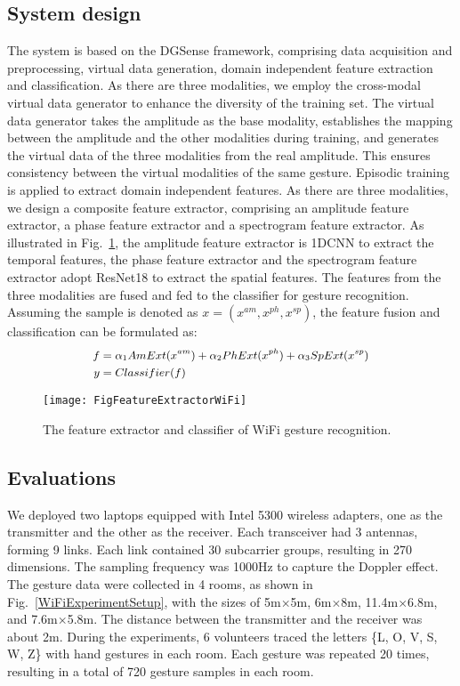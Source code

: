 \documentclass[journal]{IEEEtran}
\begin{document}
\subsection{System design} 
The system is based on the DGSense framework, comprising data acquisition and preprocessing, virtual data generation, domain independent feature extraction and classification. As there are three modalities, we employ the cross-modal virtual data generator to enhance the diversity of the training set. The virtual data generator takes the amplitude as the base modality, establishes the mapping between the amplitude and the other modalities during training, and generates the virtual data of the three modalities from the real amplitude. This ensures consistency between the virtual modalities of the same gesture. Episodic training is applied to extract domain independent features. As there are three modalities, we design a composite feature extractor, comprising an amplitude feature extractor, a phase feature extractor and a spectrogram feature extractor. As illustrated in Fig.~\ref{WiFiSystem}, the amplitude feature extractor is 1DCNN to extract the temporal features, the phase feature extractor and the spectrogram feature extractor adopt ResNet18 to extract the spatial features. The features from the three modalities are fused and fed to the classifier for gesture recognition. Assuming the sample is denoted as $x=(x^{am},x^{ph},x^{sp})$, the feature fusion and classification can be formulated as:
\begin{equation}
\small
\begin{split}
f &= \alpha_1 AmExt(x^{am}) + \alpha_2 PhExt(x^{ph}) + \alpha_3 SpExt(x^{sp})	\\
y &= Classifier(f) 
\end{split}
\end{equation}

\begin{figure}
\begin{center}
		\texttt{[image: FigFeatureExtractorWiFi]}
\caption{The feature extractor and classifier of WiFi gesture recognition.}
\label{WiFiSystem}
\end{center}
\end{figure}

\subsection{Evaluations}
We deployed two laptops equipped with Intel 5300 wireless adapters, one as the transmitter and the other as the receiver. Each transceiver had 3 antennas, forming 9 links. Each link contained 30 subcarrier groups, resulting in 270 dimensions. The sampling frequency was 1000Hz to capture the Doppler effect. The gesture data were collected in 4 rooms, as shown in Fig.~\ref{WiFiExperimentSetup}, with the sizes of 5m$\times$5m, 6m$\times$8m, 11.4m$\times$6.8m, and 7.6m$\times$5.8m. The distance between the transmitter and the receiver was about 2m. During the experiments, 6 volunteers traced the letters \{L, O, V, S, W, Z\} with hand gestures in each room. Each gesture was repeated 20 times, resulting in a total of 720 gesture samples in each room. 
\end{document}
